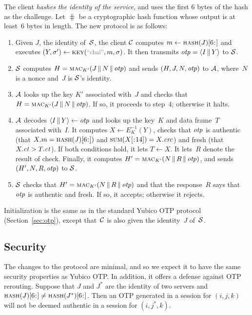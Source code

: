 The client \emph{hashes the identity of
the service}, and uses the first 6 bytes of the hash as the challenge. Let
$\hash$ be a cryptographic hash function whose output is at least~6 bytes in
length. The
new protocol is as follows:
\begin{enumerate}
  \item Given $J$, the identity of~$\mathcal{S}$, the client $\mathcal{C}$ computes $m
    \gets \substr({\hash(J)},6,)$ and executes $(Y, \sigma') \gets
    \key(\stringer{chal}, m, \sigma)$. It then transmits $\otp=\str(I\cat Y)$ to
    $\mathcal{S}$.

  \item $\mathcal{S}$ computes $H = \textsc{mac}_{K'}(J \, \| \, N \, \| \, \mathit{otp})$ and sends $(H, J,
    N, \mathit{otp})$ to $\mathcal{A}$, where~$N$ is a nonce and~$J$ is $\mathcal{S}$'s identity.

  \item $\mathcal{A}$ looks up the key $K'$ associated with~$J$ and checks that $H =
    \textsc{mac}_{K'}(J \, \| \, N \, \| \, \mathit{otp})$. If so, it proceeds to step~4; otherwise it
    halts.

  \item $\mathcal{A}$ decodes $\str(I\cat Y) \gets \otp$ and looks up the key~$K$ and
    data frame~$T$ associated with~$I$.
    It computes $X \gets E_K^{-1}(Y)$, checks that $\mathit{otp}$ is authentic (that $X.m =
    \substr({\hash(J)},6,))$ and $\checksum(\substr(X,,14))=X.\crc$) and fresh (that $X.\mathit{ct} > T.\mathit{ct}$).
    If both conditions hold, it lets $T \gets X$.  It lets~$R$ denote the result
    of check. Finally, it computes $H' = \textsc{mac}_{K'}(N \, \| \, R \, \| \, \mathit{otp})$, and sends $(H',
    N, R, \mathit{otp})$ to $\mathcal{S}$.

  \item $\mathcal{S}$ checks that $H' = \textsc{mac}_{K'}(N \, \| \, R \, \| \, \mathit{otp})$ and that the
    response~$R$ says that $\mathit{otp}$ is authentic and fresh. If so, it accepts;
    otherwise it rejects.
\end{enumerate}
Initialization is the same as in the standard Yubico OTP protocol
(Section~\ref{sec:otp}), except that~$\mathcal{C}$ is also given the identity~$J$
of~$\mathcal{S}$.

\subsection{Security}
%
The changes to the protocol are minimal, and so we expect it to have the same
security properties as Yubico OTP.
%
In addition, it offers a defense against OTP rerouting. Suppose that $J$ and
$J^*$ are the identity of two servers and $\substr({\hash(J)},6,) \ne
\substr({\hash(J^*)},6,)$. Then an OTP generated in a session for $(i, j, k)$
will not be deemed authentic in a session for $(i, j^*, k)$.

